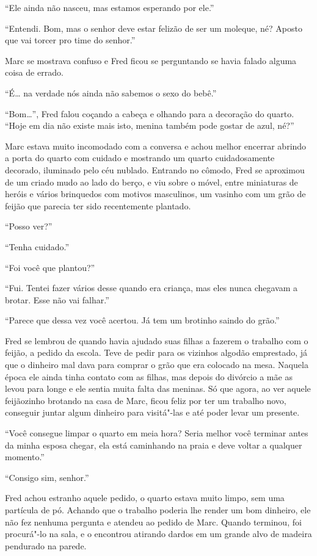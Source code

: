 ``Ele ainda não nasceu, mas estamos esperando por ele.''

``Entendi. Bom, mas o senhor deve estar felizão de ser um moleque, né?
Aposto que vai torcer pro time do senhor.''

Marc se mostrava confuso e Fred ficou se perguntando se havia falado
alguma coisa de errado.

``É\ldots{} na verdade nós ainda não sabemos o sexo do bebê.''

``Bom\ldots{}'', Fred falou coçando a cabeça e olhando para a decoração do
quarto. ``Hoje em dia não existe mais isto, menina também pode gostar de
azul, né?''

Marc estava muito incomodado com a conversa e achou melhor encerrar
abrindo a porta do quarto com cuidado e mostrando um quarto
cuidadosamente decorado, iluminado pelo céu nublado. Entrando no cômodo, Fred se
aproximou de um criado mudo ao lado do berço, e viu sobre o móvel, entre
miniaturas de heróis e vários brinquedos com motivos masculinos, um
vasinho com um grão de feijão que parecia ter sido recentemente
plantado.

``Posso ver?''

``Tenha cuidado.''

``Foi você que plantou?''

``Fui. Tentei fazer vários desse quando era criança, mas eles nunca
chegavam a brotar. Esse não vai falhar.''

``Parece que dessa vez você acertou. Já tem um brotinho saindo do
grão.''

Fred se lembrou de quando havia ajudado suas filhas a fazerem o trabalho
com o feijão, a pedido da escola. Teve de pedir para os vizinhos algodão
emprestado, já que o dinheiro mal dava para comprar o grão que era
colocado na mesa. Naquela época ele ainda tinha contato com as filhas,
mas depois do divórcio a mãe as levou para longe e ele sentia muita
falta das meninas. Só que agora, ao ver aquele feijãozinho brotando na
casa de Marc, ficou feliz por ter um trabalho novo, conseguir juntar
algum dinheiro para visitá"-las e até poder levar um presente.

``Você consegue limpar o quarto em meia hora? Seria melhor você terminar
antes da minha esposa chegar, ela está caminhando na praia e deve voltar
a qualquer momento.''

``Consigo sim, senhor.''

Fred achou estranho aquele pedido, o quarto estava muito limpo, sem uma
partícula de pó. Achando que o trabalho poderia lhe render um bom
dinheiro, ele não fez nenhuma pergunta e atendeu ao pedido de Marc.
Quando terminou, foi procurá"-lo na sala, e o encontrou atirando dardos em
um grande alvo de madeira pendurado na parede.

